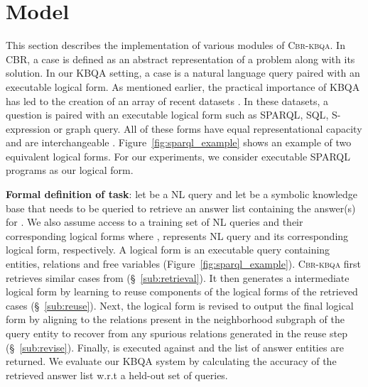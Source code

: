 \documentclass{article}
\newcommand{\alg}{\textsc{Cbr-kbqa}\xspace}
\begin{document}
 
\section{Model}
\label{sec:model}
This section describes the implementation of various modules of \alg. In CBR, a case is defined as an abstract representation of a problem along with its solution. In our KBQA setting, a case is a natural language query paired with an executable logical form. As mentioned earlier, the practical importance of KBQA has led to the creation of an array of recent datasets \citep[inter-alia]{zelle1996learning,bordes2015large,su2016generating,yih2016value,zhong2017seq2sql,ngomo20189th,yu2018spider,Talmor2018TheWA}. In these datasets, a question is paired with an executable logical form such as \textsc{SPARQL}, \textsc{SQL}, S-expression or graph query. All of these forms have equal representational capacity and are interchangeable \cite{su2016generating}. Figure~\ref{fig:sparql_example} shows an example of two equivalent logical forms. For our experiments, we consider executable \textsc{SPARQL} programs as our logical form.

\textbf{Formal definition of task}: let  be a NL query and let  be a symbolic knowledge base that needs to be queried to retrieve an answer list  containing the answer(s) for . We also assume access to a training set  of NL queries and their corresponding logical forms where ,   represents NL query and its corresponding logical form, respectively. A logical form is an executable query containing entities, relations and free variables (Figure~\ref{fig:sparql_example}). \alg first retrieves  similar cases   from  (\S~\ref{sub:retrieval}). It then generates a intermediate logical form  by learning to reuse components of the logical forms of the retrieved cases (\S~\ref{sub:reuse}). Next, the logical form  is revised to output the final logical form  by aligning to the relations present in the neighborhood subgraph of the query entity to recover from any spurious relations generated in the reuse step (\S~\ref{sub:revise}). Finally,  is executed against  and the list of answer entities are returned. We evaluate our KBQA system by calculating the accuracy of the retrieved answer list w.r.t a held-out set of queries.
\end{document}
